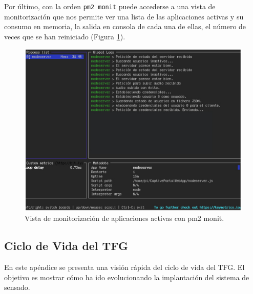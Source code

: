 \begin{appendices}

Por último, con la orden \texttt{pm2 monit} puede accederse a una vista de monitorización que nos permite ver una lista de las aplicaciones activas y su consumo en memoria, la salida en consola de cada una de ellas, el número de veces que se han reiniciado (Figura \ref{pm2monit}).

\begin{figure}[!t]
\begin{center}
\includegraphics[width=0.75\linewidth]{./X_Anexos/Img/pm2monit.png}
\end{center}
\caption{Vista de monitorización de aplicaciones activas con pm2 monit.}
\label{pm2monit}
\end{figure}
\cleardoublepage
{}%
\begin{center}
\begin{minipage}{.75\textwidth}
\section{Ciclo de Vida del TFG}\label{ApendiceD}

En este apéndice se presenta una visión rápida del ciclo de vida del TFG. El objetivo es mostrar cómo ha ido evolucionando la implantación del sistema de sensado.
\end{minipage}
\end{center}
\clearpage%


\end{appendices}
